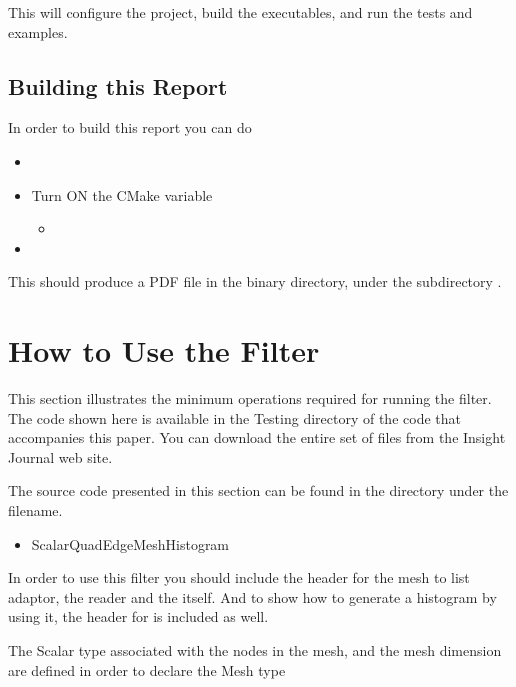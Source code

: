 \documentclass{InsightArticle}
\begin{document}
This will configure the project, build the executables, and run the tests and
examples. 


\subsection{Building this Report}

In order to build this report you can do

\begin{itemize}
\item {}
\item Turn ON the CMake variable
\begin{itemize}
\item {}
\end{itemize}
\item {}
\end{itemize}

This should produce a PDF file in the binary directory, under the subdirectory
.


\section{How to Use the Filter}

This section illustrates the minimum operations required for running the filter. The code shown here 
is available in the Testing directory of the code that accompanies this paper. You can download the 
entire set of files from the Insight Journal web site.

The source code presented in this section can be found in the  directory under the filename.

\begin{itemize}
\item ScalarQuadEdgeMeshHistogram
\end{itemize}

In order to use this filter you should include the header for the mesh to list adaptor, the reader and 
the  itself. And to show how to generate a histogram by 
using it, the header for  is included as well.

\begin{center}

\end{center}

The Scalar type associated with the nodes in the mesh, and the mesh dimension
are defined in order to declare the Mesh type
\end{document}
